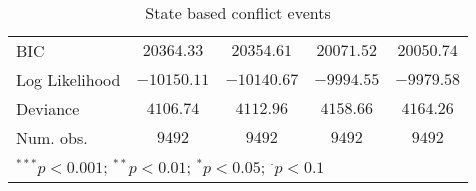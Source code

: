 \begin{sidewaystable}
\begin{center}
{\begin{tabular}{l c c c c}
BIC             & $20364.33$    & $20354.61$    & $20071.52$    & $20050.74$      \\
Log Likelihood  & $-10150.11$   & $-10140.67$   & $-9994.55$    & $-9979.58$      \\
Deviance        & $4106.74$     & $4112.96$     & $4158.66$     & $4164.26$       \\
Num. obs.       & $9492$        & $9492$        & $9492$        & $9492$          \\
\hline
\multicolumn{5}{l}{\scriptsize{$^{***}p<0.001$; $^{**}p<0.01$; $^{*}p<0.05$; $^{\cdot}p<0.1$}}
\end{tabular}
}
\caption{State based conflict events}
\label{state_based}
\end{center}
\end{sidewaystable}
